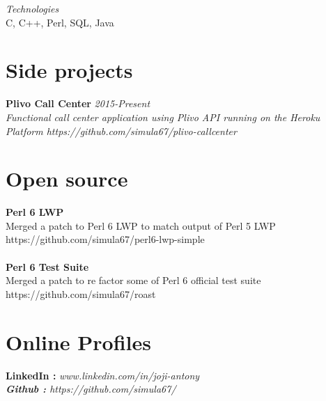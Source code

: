 \documentclass[line,margin]{res}
\begin{document}
\begin{resume}
{\it{Technologies}}\\
C, C++, Perl, SQL, Java

\section{Side projects}
{\bf Plivo Call Center} \hfill \it{2015-Present}\\
Functional call center application using Plivo API running on the Heroku Platform
https://github.com/simula67/plivo-callcenter\\


\section{Open source}
{\bf Perl 6 LWP}\\
Merged a patch to Perl 6 LWP to match output of Perl 5 LWP\\
https://github.com/simula67/perl6-lwp-simple\\ \\
{\bf Perl 6 Test Suite}\\
Merged a patch to re factor some of Perl 6 official test suite\\
https://github.com/simula67/roast\\

\section{Online Profiles}
{\bf LinkedIn :} \it{www.linkedin.com/in/joji-antony} \\
{\bf Github :} \it{https://github.com/simula67/} \\

\end{resume}
\end{document}
